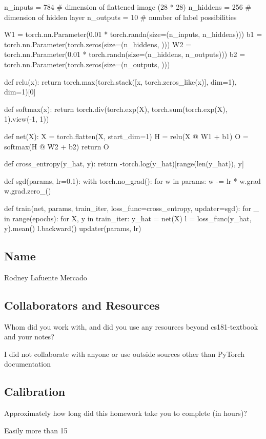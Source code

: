 \documentclass[submit]{harvardml}
\begin{document}
\begin{python}
n_inputs = 784 # dimension of flattened image (28 * 28)
n_hiddens = 256 # dimension of hidden layer
n_outputs = 10 # number of label possibilities

W1 = torch.nn.Parameter(0.01 * torch.randn(size=(n_inputs, n_hiddens)))
b1 = torch.nn.Parameter(torch.zeros(size=(n_hiddens, )))
W2 = torch.nn.Parameter(0.01 * torch.randn(size=(n_hiddens, n_outputs)))
b2 = torch.nn.Parameter(torch.zeros(size=(n_outputs, )))

def relu(x):
    return torch.max(torch.stack([x, torch.zeros_like(x)], dim=1), dim=1)[0]

def softmax(x):
    return torch.div(torch.exp(X), torch.sum(torch.exp(X), 1).view(-1, 1))

def net(X):
    X = torch.flatten(X, start_dim=1)
    H = relu(X @ W1 + b1)
    O = softmax(H @ W2 + b2)
    return O

def cross_entropy(y_hat, y):
    return -torch.log(y_hat)[range(len(y_hat)), y]

def sgd(params, lr=0.1):
    with torch.no_grad():
        for w in params:
            w -= lr * w.grad
            w.grad.zero_()

def train(net, params, train_iter, loss_func=cross_entropy, updater=sgd):
    for _ in range(epochs):
        for X, y in train_iter:
            y_hat = net(X)
            l = loss_func(y_hat, y).mean()
            l.backward()
            updater(params, lr)

\end{python}


\newpage
\subsection*{Name}
Rodney Lafuente Mercado

\subsection*{Collaborators and Resources}
Whom did you work with, and did you use any resources beyond cs181-textbook and your notes?

I did not collaborate with anyone or use outside sources other than PyTorch documentation
\subsection*{Calibration}
Approximately how long did this homework take you to complete (in hours)? 

Easily more than 15
\end{document}
